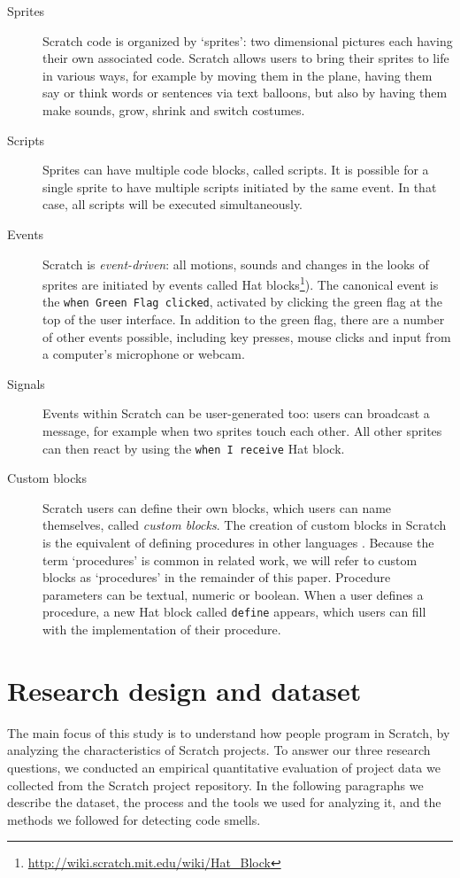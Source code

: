 \documentclass{sig-alternate-05-2015}
\begin{document}
\begin{description}
	\item [Sprites] Scratch code is organized by `sprites': two dimensional pictures each having their own associated code. Scratch allows users to bring their sprites to life in various ways, for example by moving them in the plane, having them say or think words or sentences via text balloons, but also by having them make sounds, grow, shrink and switch costumes.
	\item [Scripts]Sprites can have multiple code blocks, called scripts. It is possible for a single sprite to have multiple scripts initiated by the same event. In that case, all scripts will be executed simultaneously.
	\item [Events] Scratch is \emph{event-driven}: all motions, sounds and changes in the looks of sprites are initiated by events called Hat blocks\footnote{\url{http://wiki.scratch.mit.edu/wiki/Hat_Block}}). The canonical event is the \texttt{when Green Flag clicked}, activated by clicking the green flag at the top of the user interface. In addition to the green flag, there are a number of other events possible, including key presses, mouse clicks and input from a computer's microphone or webcam.
	\item [Signals] Events within Scratch can be user-generated too: users can broadcast a message, for example when two sprites touch each other. All other sprites can then react by using the \texttt{when I receive} Hat block.
	\item[Custom blocks] Scratch users can define their own blocks, which users can name themselves, called \textit{custom blocks}. The creation of custom blocks in Scratch is the equivalent of defining procedures in other languages \cite{moreno_automatic_2014}. Because the term `procedures' is common in related work, we will refer to custom blocks as `procedures' in the remainder of this paper. Procedure parameters can be textual, numeric or boolean. When a user defines a procedure, a new Hat block called \texttt{define} appears, which users can fill with the implementation of their procedure.
\end{description}

\section{Research design and dataset}
\label{researchDesign}

The main focus of this study is to understand how people program in Scratch, by analyzing the characteristics of Scratch projects. To answer our three research questions, we conducted an empirical quantitative evaluation of project data we collected from the Scratch project repository. In the following paragraphs we describe the dataset, the process and the tools we used for analyzing it, and the methods we followed for detecting code smells.
\end{document}
